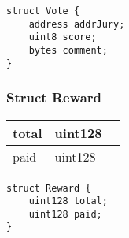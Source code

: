 \begin{lstlisting}[firstnumber=37]
struct Vote {
    address addrJury;
    uint8 score;
    bytes comment;
}
\end{lstlisting}

\subsubsection{Struct Reward}


\ifsoltables
\noindent\begin{tabular}{|l|l|p{6cm}|}\hline
total & uint128 & \\\hline
paid & uint128 & \\\hline
\end{tabular}
\fi


\begin{lstlisting}[firstnumber=43]
struct Reward {
    uint128 total;
    uint128 paid;
}
\end{lstlisting}
